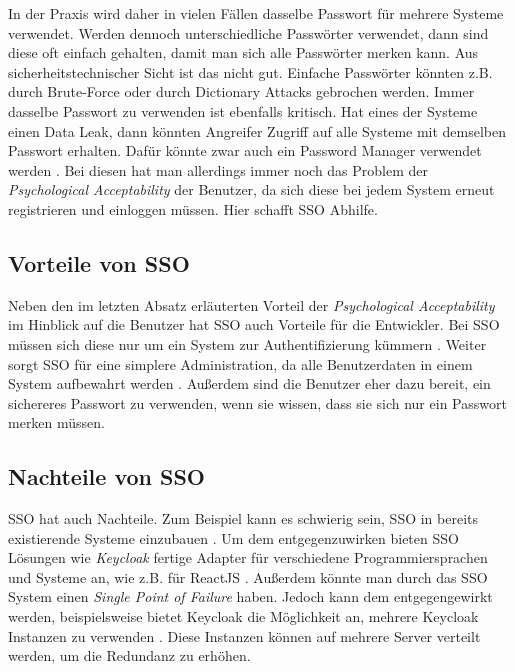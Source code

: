 In der Praxis wird daher in vielen Fällen dasselbe Passwort für mehrere Systeme verwendet. Werden dennoch unterschiedliche Passwörter verwendet, dann sind diese oft einfach gehalten, damit man sich alle Passwörter merken kann. Aus sicherheitstechnischer Sicht ist das nicht gut. Einfache Passwörter könnten z.B. durch Brute-Force oder durch Dictionary Attacks gebrochen werden. Immer dasselbe Passwort zu verwenden ist ebenfalls kritisch. Hat eines der Systeme einen Data Leak, dann könnten Angreifer Zugriff auf alle Systeme mit demselben Passwort erhalten. Dafür könnte zwar auch ein Password Manager verwendet werden \cite{EB34}. Bei diesen hat man allerdings immer noch das Problem der \textit{Psychological Acceptability} der Benutzer, da sich diese bei jedem System erneut registrieren und einloggen müssen. Hier schafft SSO Abhilfe.

\subsection{Vorteile von SSO}


Neben den im letzten Absatz erläuterten Vorteil der \textit{Psychological Acceptability} im Hinblick auf die Benutzer hat SSO auch Vorteile für die Entwickler. Bei SSO müssen sich diese nur um ein System zur Authentifizierung kümmern \cite{EB34}. Weiter sorgt SSO für eine simplere Administration, da alle Benutzerdaten in einem System aufbewahrt werden \cite{EB34}. Außerdem sind die Benutzer eher dazu bereit, ein sichereres Passwort zu verwenden, wenn sie wissen, dass sie sich nur ein Passwort merken müssen.

\subsection{Nachteile von SSO}

SSO hat auch Nachteile. Zum Beispiel kann es schwierig sein, SSO in bereits existierende Systeme einzubauen \cite{EB34}. Um dem entgegenzuwirken bieten SSO Lösungen wie \textit{Keycloak} fertige Adapter für verschiedene Programmiersprachen und Systeme an, wie z.B. für ReactJS \cite[OpenID Connect]{EB26} \cite{EB36}. Außerdem könnte man durch das SSO System einen \textit{Single Point of Failure} haben. Jedoch kann dem entgegengewirkt werden, beispielsweise bietet Keycloak die Möglichkeit an, mehrere Keycloak Instanzen zu verwenden \cite{EB33}. Diese Instanzen können auf mehrere Server verteilt werden, um die Redundanz zu erhöhen. %

